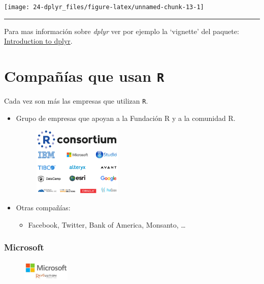 \documentclass[]{book}
\providecommand{\tightlist}{%
  \setlength{\itemsep}{0pt}\setlength{\parskip}{0pt}}
\begin{document}
\begin{center}\texttt{[image: 24-dplyr\_files/figure-latex/unnamed-chunk-13-1]} \end{center}

\begin{center}\rule{0.5\linewidth}{\linethickness}\end{center}

Para mas información sobre \emph{dplyr} ver por ejemplo la `vignette'
del paquete:\\
\href{http://cran.rstudio.com/web/packages/dplyr/vignettes/introduction.html}{Introduction
to dplyr}.

\chapter{\texorpdfstring{Compañías que usan
\texttt{R}}{Compañías que usan R}}\label{companias-que-usan-r}

Cada vez son más las empresas que utilizan \texttt{R}.

\begin{itemize}
\item
  Grupo de empresas que apoyan a la Fundación R y a la comunidad R.

  \begin{figure}
  \centering
  \includegraphics[width=0.40000\textwidth]{figuras/rconsortium2.png}
  \caption{}
  \end{figure}
\item
  Otras compañías:

  \begin{itemize}
  \tightlist
  \item
    Facebook, Twitter, Bank of America, Monsanto, \ldots{}
  \end{itemize}
\end{itemize}

\subsection{Microsoft}\label{microsoft}

\begin{figure}
\centering
\includegraphics[width=0.20000\textwidth]{figuras/Revolution.jpeg}
\caption{}
\end{figure}
\end{document}
